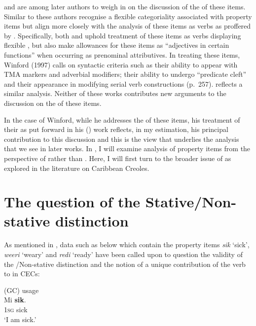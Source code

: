 \citet{Winford1997} and \citet{Migge2000} are among later authors to
weigh in on the discussion of the  of these items.
Similar to \citet{Kouwenberg1996} these authors recognise a flexible
categoriality associated with property items but align more closely
with the analysis of these items as verbs as proffered by
\citet{Sebba1986}.  Specifically, both \citet{Winford1997} and
\citet{Migge2000} uphold treatment of these items as verbs displaying
flexible , but also make allowances for these items as
``adjectives in certain functions” \citep[249]{Winford1997} when
occurring as prenominal attributives.  In treating these items,
Winford (1997) calls on syntactic criteria such as their ability to appear
with TMA markers and adverbial modifiers; their ability to undergo
``predicate cleft” and their appearance in modifying serial verb
constructions (p.~257).  \citet{Migge2000} reflects a similar
analysis.  Neither of these works contributes new arguments to the
discussion on the  of these items.

In the case of Winford, while he addresses the  of
these items, his treatment of their  as put forward in
his (\citeyear{Winford1993}) work reflects, in my estimation, his principal
contribution to this discussion and this is the view that underlies
the analysis that we see in later works.  In , I will
examine  analysis of property items from the
perspective of  rather than .  Here,
I will first turn to the broader issue of  as explored in the
literature on Caribbean Creoles.

\section{The question of the Stative/Non-stative
  distinction}\label{sec:3.2}

As mentioned in , data such as  below which contain
the property items \textit{sik} `sick', \textit{weeri} `weary' and
\textit{redi}  `ready' have been called upon to question the validity
of the \slash Non-stative distinction and the notion of a unique
contribution of the verb to  in CECs:

\ea%
\label{ex:3:15}

 (GC)  usage\\\citep[31]{Jaganauth1987}
\ea
\gll  Mi \textbf{sik}.\\
\textsc{1sg} sick\\
\glt `I am sick.'


